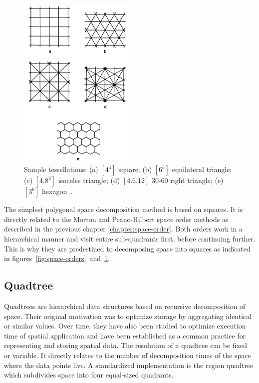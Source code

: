 \begin{figure}[h]
  \begin{center}
    \includegraphics[width=0.5\textwidth]{figures/space_decompositions.png}
    \caption{Sample tessellations: (a) $[4^4]$ square; (b) $[6^3]$ equilateral triangle; (c) $[4.8^2]$ isoceles triangle; (d) $[4.6.12]$ 30-60 right triangle; (e) $[3^6]$ hexagon~\cite[p 17]{Samet90spatialdata}.}
    \label{fig:space-decompositions}
  \end{center}
\end{figure}

The simplest polygonal space decomposition method is based on squares. It is directly related to the Morton and Peano-Hilbert space order methods as described in the previous chapter \ref{chapter:space-order}. Both orders work in a hierarchical manner and visit entire sub-quadrants first, before continuing further. This is why they are predestined to decomposing space into squares as indicated in figures~\ref{fig:space-orders}~and~\ref{fig:space-decompositions}.

\subsection{Quadtree}

Quadtrees are hierarchical data structures based on recursive decomposition of space. Their original motivation was to optimize storage by aggregating identical or similar values. Over time, they have also been studied to optimize execution time of spatial application and have been established as a common practice for representing and storing spatial data. The resolution of a quadtree can be fixed or variable. It directly relates to the number of decomposition times of the space where the data points live. A standardized implementation is the region quadtree which subdivides space into four equal-sized quadrants.

